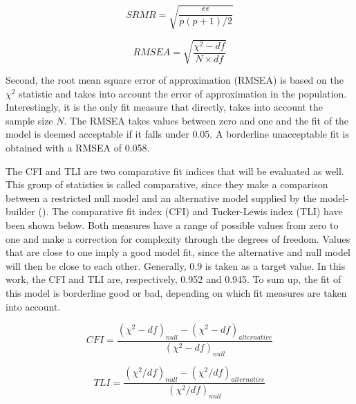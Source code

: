 \documentclass[11pt]{article}
\begin{document}
\begin{minipage}{0.48\linewidth}
\begin{equation}
\label{eq:srmr}
  SRMR = \sqrt{\dfrac{\epsilon \epsilon}{p(p+1)/2}}
\end{equation}
\end{minipage}
\begin{minipage}{0.48\linewidth}
\begin{equation}
\label{eq:rmsea}
  RMSEA = \sqrt{\dfrac{\chi^2 - df}{N \times df}}
\end{equation}
\end{minipage}

Second, the root mean square error of approximation (RMSEA) is based on the
$\chi^2$ statistic and takes into account the error of approximation in the
population. Interestingly, it is the only fit measure that directly, takes into
account the sample size $N$. The RMSEA takes values between zero and one and the
fit of the model is deemed acceptable if it falls under 0.05. A borderline
unacceptable fit is obtained with a RMSEA of 0.058.

The CFI and TLI are two comparative fit indices that will be evaluated as well.
This group of statistics is called comparative, since they make a comparison
between a restricted null model and an alternative model supplied by
the model-builder (\cite{brown2015}). The comparative fit index (CFI) and
Tucker-Lewis index (TLI) have been shown below. Both measures have a range of
possible values from zero to one and make a correction for complexity through
the degrees of freedom. Values that are close to one imply a good model fit,
since the alternative and null model will then be close to each other.
Generally, 0.9 is taken as a target value. In this work, the CFI and TLI
are, respectively, 0.952 and 0.945. To sum up, the fit of this model is
borderline good or bad, depending on which fit measures are taken into account.

\begin{minipage}{0.48\linewidth}
\begin{equation}
\label{eq:cfi}
    CFI = \dfrac{(\chi^2 - df)_{null} - (\chi^2 - df)_{alternative}}{(\chi^2 - df)_{null}}
\end{equation}
\end{minipage}
\begin{minipage}{0.48\linewidth}
\begin{equation}
\label{eq:tli}
    TLI = \dfrac{(\chi^2 / df)_{null} - (\chi^2 / df)_{alternative}}{(\chi^2 / df)_{null}}
\end{equation}
\end{minipage}
\end{document}
